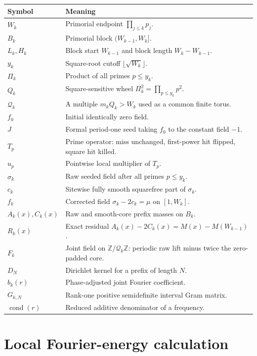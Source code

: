 \documentclass[11pt]{article}
\theoremstyle{definition}
\newcommand{\Z}{\mathbb Z}
\newcommand{\cond}{\operatorname{cond}}
\begin{document}
\begin{longtable}{>{\raggedright\arraybackslash}p{}p{}}
\toprule
Symbol & Meaning\\
\midrule
\endhead
$W_k$ & Primorial endpoint $\prod_{j\le k}p_j$.\\
$B_k$ & Primorial block $(W_{k-1},W_k]$.\\
$L_k,H_k$ & Block start $W_{k-1}$ and block length $W_k-W_{k-1}$.\\
$y_k$ & Square-root cutoff $\lfloor\sqrt{W_k}\rfloor$.\\
$\Pi_k$ & Product of all primes $p\le y_k$.\\
$Q_k$ & Square-sensitive wheel $\Pi_k^2=\prod_{p\le y_k}p^2$.\\
$\mathcal Q_k$ & A multiple $m_kQ_k>W_k$ used as a common finite torus.\\
$f_0$ & Initial identically zero field.\\
$J$ & Formal period-one seed taking $f_0$ to the constant field $-1$.\\
$T_p$ & Prime operator: miss unchanged, first-power hit flipped, square hit killed.\\
$u_p$ & Pointwise local multiplier of $T_p$.\\
$\sigma_k$ & Raw seeded field after all primes $p\le y_k$.\\
$c_k$ & Sitewise fully smooth squarefree part of $\sigma_k$.\\
$f_k$ & Corrected field $\sigma_k-2c_k=\mu$ on $[1,W_k]$.\\
$A_k(x),C_k(x)$ & Raw and smooth-core prefix masses on $B_k$.\\
$R_k(x)$ & Exact residual $A_k(x)-2C_k(x)=M(x)-M(W_{k-1})$.\\
$F_k$ & Joint field on $\Z/\mathcal Q_k\Z$: periodic raw lift minus twice the zero-padded core.\\
$D_N$ & Dirichlet kernel for a prefix of length $N$.\\
$b_k(r)$ & Phase-adjusted joint Fourier coefficient.\\
$G_{k,N}$ & Rank-one positive semidefinite interval Gram matrix.\\
$\cond(r)$ & Reduced additive denominator of a frequency.\\
\bottomrule
\end{longtable}

\section{Local Fourier-energy calculation}
\end{document}
